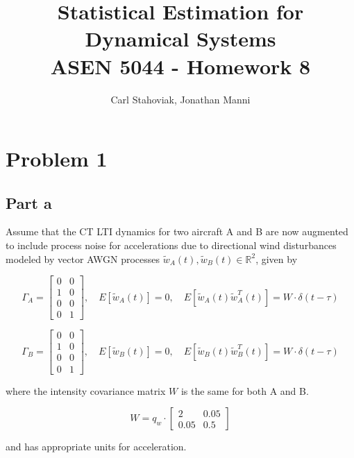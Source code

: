 \documentclass[]{article}
\title{Statistical Estimation for Dynamical Systems\\ASEN 5044 - Homework 8}
\author{Carl Stahoviak, Jonathan Manni}
\begin{document}
\maketitle

%

\tableofcontents
\listoftodos[Notes]

\newpage
\section*{Problem 1}

\subsection*{Part a}

Assume that the CT LTI dynamics for two aircraft A and B are now augmented to include process noise for accelerations due to directional wind disturbances modeled by vector AWGN processes $\tilde{w}_A(t),\tilde{w}_B(t) \in \mathbb{R}^2$, given by

$$
\Gamma_A = \left[
\begin{array}{cc}
0 & 0\\
1 & 0\\
0 & 0\\
0 & 1
\end{array}
\right],\quad
E[\tilde{w}_A(t)]=0,\quad E[\tilde{w}_A(t)\tilde{w}_A^T(t)]=W\cdot\delta(t-\tau)
$$

$$
\Gamma_B = \left[
\begin{array}{cc}
0 & 0\\
1 & 0\\
0 & 0\\
0 & 1
\end{array}
\right],\quad
E[\tilde{w}_B(t)]=0,\quad E[\tilde{w}_B(t)\tilde{w}_B^T(t)]=W\cdot\delta(t-\tau)
$$

\noindent where the intensity covariance matrix $W$ is the same for both A and B.

$$
W = q_w\cdot\left[\begin{array}{cc} 2 & 0.05\\ 0.05 & 0.5 \end{array}\right]
$$

\noindent and has appropriate units for acceleration.\\
\end{document}
